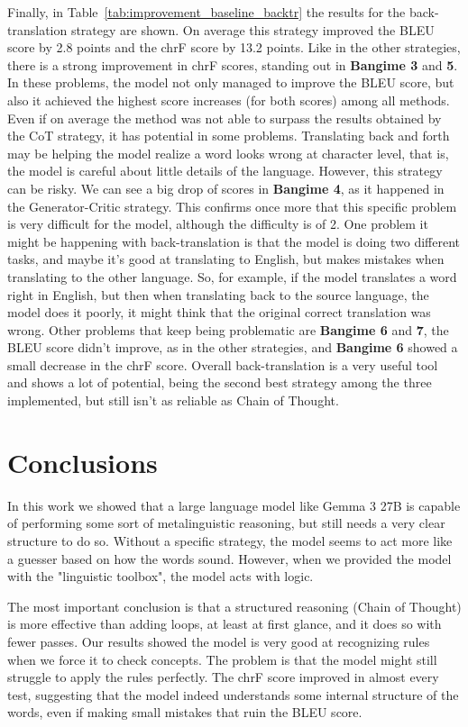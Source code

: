 \documentclass[
	a4paper, %
	10pt, %
	unnumberedsections, %
	twoside, %
]{LTJournalArticle}
\begin{document}
Finally, in Table~\ref{tab:improvement_baseline_backtr} the results for the back-translation strategy are shown. On average this strategy improved the BLEU score by 2.8 points and the chrF score by 13.2 points. Like in the other strategies, there is a strong improvement in chrF scores, standing out in \textbf{Bangime 3} and \textbf{5}. In these problems, the model not only managed to improve the BLEU score, but also it achieved the highest score increases (for both scores) among all methods. Even if on average the method was not able to surpass the results obtained by the CoT strategy, it has potential in some problems. Translating back and forth may be helping the model realize a word looks wrong at character level, that is, the model is careful about little details of the language.
However, this strategy can be risky. We can see a big drop of scores in \textbf{Bangime 4}, as it happened in the Generator-Critic strategy. This confirms once more that this specific problem is very difficult for the model, although the difficulty is of 2. One problem it might be happening with back-translation is that the model is doing two different tasks, and maybe it's good at translating to English, but makes mistakes when translating to the other language. So, for example, if the model translates a word right in English, but then when translating back to the source language, the model does it poorly, it might think that the original correct translation was wrong. Other problems that keep being problematic are \textbf{Bangime 6} and \textbf{7}, the BLEU score didn't improve, as in the other strategies, and \textbf{Bangime 6} showed a small decrease in the chrF score.
Overall back-translation is a very useful tool and shows a lot of potential, being the second best strategy among the three implemented, but still isn't as reliable as Chain of Thought. 




\section{Conclusions}
In this work we showed that a large language model like Gemma 3 27B is capable of performing some sort of metalinguistic reasoning, but still needs a very clear structure to do so. Without a specific strategy, the model seems to act more like a guesser based on how the words sound. However, when we provided the model with the "linguistic toolbox", the model acts with logic.

The most important conclusion is that a structured reasoning (Chain of Thought) is more effective than adding loops, at least at first glance, and it does so with fewer passes. Our results showed the model is very good at recognizing rules when we force it to check concepts. The problem is that the model might still struggle to apply the rules perfectly. The chrF score improved in almost every test, suggesting that the model indeed understands some internal structure of the words, even if making small mistakes that ruin the BLEU score.
\end{document}
